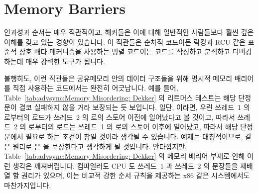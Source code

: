 
\section{Memory Barriers}
\label{sec:advsync:Memory Barriers}

인과성과 순서는 매우 직관적이고, 해커들은 이에 대해 일반적인 사람들보다 훨씬
깊은 이해를 갖고 있는 경향이 있습니다.
이 직관들은 순차적 코드이든 락킹과 RCU 같은 표준적 상호 배타 메커니즘을
사용하는 병렬 코드이든 코드를 작성하고 분석하고 디버깅하는데 매우 강력한 도구가
됩니다.

\begin{table}
\caption{Memory Misordering: Dekker}
\label{tab:advsync:Memory Misordering: Dekker}
\end{table}

불행히도, 이런 직관들은 공유메모리 안의 데이터 구조들을 위해 명시적 메모리
배리어를 직접 사용하는 코드에서는 완전히 어긋납니다.
예를 들어, Table~\ref{tab:advsync:Memory Misordering: Dekker} 의 리트머스
테스트는 해당 단정문이 결코 실패하지 않을 거라 보장되는 듯 보입니다.
일단,  이라면, 우린 쓰레드~1 의  로부터의 로드가 쓰레드~2 의
 로의 스토어 이전에 일어났다고 볼 것이고, 따라서 쓰레드~2 의 
로부터의 로드는 쓰레드~1 의  로의 스토어 이후에 일어났고, 따라서 해당
단정문에서 필요로 하는  조건이 참일 것이라 생각될 수 있습니다.
예제는 대칭적이므로, 같은 원리로  은  을 보장한다고
생각하게 될 것입니다.
안타깝지만, Table~\ref{tab:advsync:Memory Misordering: Dekker} 의 메모리 배리어
부재로 인해 이런 생각은 깨져버립니다.
컴파일러도 CPU 도 쓰레드~1 과 쓰레드~2 의 문장들을 재배열 할 권리가 있으며,
이는 비교적 강한 순서 규칙을 제공하는 x86 같은 시스템에서도 마찬가지입니다.
\iffalse

